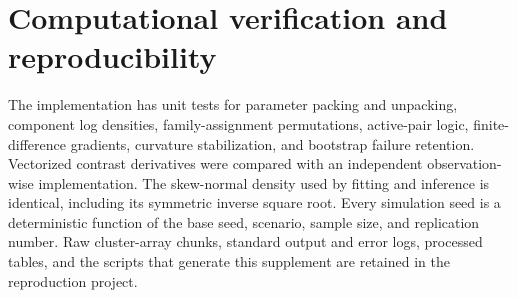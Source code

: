 

\section{Computational verification and reproducibility}

The implementation has unit tests for parameter packing and unpacking,
component log densities, family-assignment permutations, active-pair logic,
finite-difference gradients, curvature stabilization, and bootstrap failure
retention.  Vectorized contrast derivatives were compared with an independent
observation-wise implementation.  The skew-normal density used by fitting and
inference is identical, including its symmetric inverse square root.  Every
simulation seed is a deterministic function of the base seed, scenario,
sample size, and replication number.  Raw cluster-array chunks, standard
output and error logs, processed tables, and the scripts that generate this
supplement are retained in the reproduction project.
